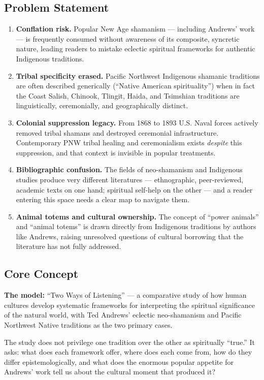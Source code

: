 \documentclass[11pt,letterpaper]{article}
\begin{document}
\subsection{Problem Statement}

\begin{enumerate}
  \item \textbf{Conflation risk.} Popular New Age shamanism --- including Andrews' work --- is frequently consumed without awareness of its composite, syncretic nature, leading readers to mistake eclectic spiritual frameworks for authentic Indigenous traditions.
  \item \textbf{Tribal specificity erased.} Pacific Northwest Indigenous shamanic traditions are often described generically (``Native American spirituality'') when in fact the Coast Salish, Chinook, Tlingit, Haida, and Tsimshian traditions are linguistically, ceremonially, and geographically distinct.
  \item \textbf{Colonial suppression legacy.} From 1868 to 1893 U.S. Naval forces actively removed tribal shamans and destroyed ceremonial infrastructure. Contemporary PNW tribal healing and ceremonialism exists \emph{despite} this suppression, and that context is invisible in popular treatments.
  \item \textbf{Bibliographic confusion.} The fields of neo-shamanism and Indigenous studies produce very different literatures --- ethnographic, peer-reviewed, academic texts on one hand; spiritual self-help on the other --- and a reader entering this space needs a clear map to navigate them.
  \item \textbf{Animal totems and cultural ownership.} The concept of ``power animals'' and ``animal totems'' is drawn directly from Indigenous traditions by authors like Andrews, raising unresolved questions of cultural borrowing that the literature has not fully addressed.
\end{enumerate}

\subsection{Core Concept}

\textbf{The model:} ``Two Ways of Listening'' --- a comparative study of how human cultures develop systematic frameworks for interpreting the spiritual significance of the natural world, with Ted Andrews' eclectic neo-shamanism and Pacific Northwest Native traditions as the two primary cases.

The study does not privilege one tradition over the other as spiritually ``true.'' It asks: what does each framework offer, where does each come from, how do they differ epistemologically, and what does the enormous popular appetite for Andrews' work tell us about the cultural moment that produced it?
\end{document}
